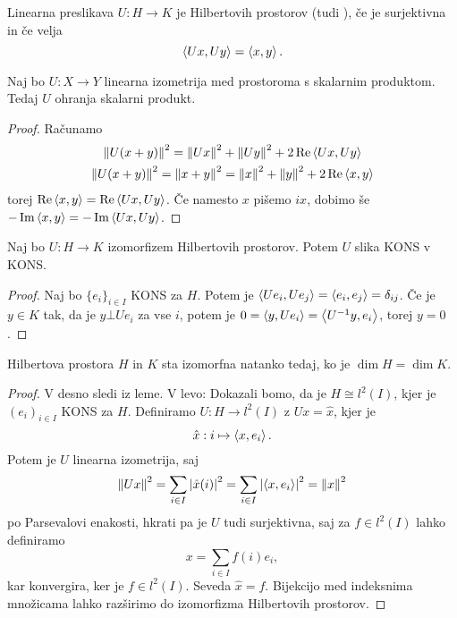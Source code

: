
\begin{definicija}
  Linearna preslikava $U: H \to K$ je  Hilbertovih
  prostorov (tudi ), če je surjektivna in če velja
  \[
	\left< Ux, Uy \right> = \left< x,y \right>.
  \]
\end{definicija}

\begin{trditev}
  Naj bo $U: X \to Y$ linearna izometrija med prostoroma s skalarnim produktom.
  Tedaj $U$ ohranja skalarni produkt.
\end{trditev}

\begin{proof}
  Računamo
  \begin{gather*}
	\left\lVert U(x+y)\right\rVert^2 = \left\lVert Ux\right\rVert^2 + \left\lVert Uy\right\rVert^2 + 2 \operatorname{Re} \left< Ux, Uy \right> \\
	\left\lVert U(x+y)\right\rVert^2 = \left\lVert x+y\right\rVert^2 = \left\lVert x\right\rVert^2 + \left\lVert y\right\rVert^2 + 2 \operatorname{Re} \left< x, y \right>
  \end{gather*}
  torej $\operatorname{Re} \left< x,y \right> = \operatorname{Re} \left< Ux, Uy \right>$.
  Če namesto $x$ pišemo $ix$, dobimo še $- \operatorname{Im} \left< x,y \right> = - \operatorname{Im} \left< Ux,
	Uy \right>$.
\end{proof}


\begin{lema}
  Naj bo $U: H \to K$ izomorfizem Hilbertovih prostorov.
  Potem $U$ slika KONS v KONS.
\end{lema}

\begin{proof}
  Naj bo $\{e_i\}_{i \in I}$ KONS za $H$.
  Potem je $\left< Ue_i, U e_j \right> = \left< e_i, e_j \right> = \delta_{ij}$.
  Če je $y \in K$ tak, da je $y \bot U e_i$ za vse $i$, potem je $0 = \left< y, U
	e_i \right> = \left< U^{-1} y, e_i \right>$, torej $y = 0$.
\end{proof}

\begin{izrek}
  Hilbertova prostora $H$ in $K$ sta izomorfna natanko tedaj, ko je $\dim H =
  \dim K$.
\end{izrek}

\begin{proof}
  V desno sledi iz leme.
  V levo:
  Dokazali bomo, da je $H \cong l^2(I)$, kjer je $(e_i)_{i \in I}$ KONS za $H$.
  Definiramo $U: H \to l^2(I)$ z $Ux = \hat{x}$, kjer je
  \[
	\hat{x}: i \mapsto \left< x, e_i \right>.
  \]
  Potem je $U$ linearna izometrija, saj
  \[
	\left\lVert Ux\right\rVert^2 = \sum_{i \in I} \left| \hat{x}(i) \right|^2 = \sum_{i \in I} \left| \left< x,
	  e_i \right> \right|^2 = \left\lVert x\right\rVert^2
  \]
  po Parsevalovi enakosti, hkrati pa je $U$ tudi surjektivna, saj za $f \in
  l^2(I)$ lahko definiramo
  \[
	x = \sum_{i \in I} f(i) e_i,
  \]
  kar konvergira, ker je $f \in l^2(I)$.
  Seveda $\hat{x} = f$.
  Bijekcijo med indeksnima množicama lahko razširimo do izomorfizma Hilbertovih
  prostorov.
\end{proof}

